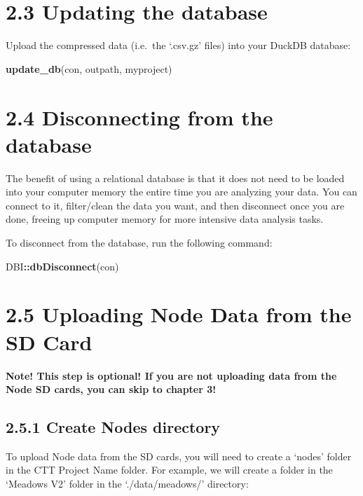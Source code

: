 \documentclass[
]{book}
\newenvironment{Shaded}{\begin{snugshade}}{\end{snugshade}}
\newcommand{\FunctionTok}[1]{\textcolor[rgb]{0.13,0.29,0.53}{\textbf{#1}}}
\newcommand{\NormalTok}[1]{#1}
\newcommand{\SpecialCharTok}[1]{\textcolor[rgb]{0.81,0.36,0.00}{\textbf{#1}}}
\begin{document}
\section{2.3 Updating the database}\label{updating-the-database}

Upload the compressed data (i.e.~the `.csv.gz' files) into your DuckDB database:

\begin{Shaded}
\begin{Highlighting}[]
\FunctionTok{update\_db}\NormalTok{(con, outpath, myproject)}
\end{Highlighting}
\end{Shaded}

\section{2.4 Disconnecting from the database}\label{disconnecting-from-the-database}

The benefit of using a relational database is that it does not need to be loaded into your computer memory the entire time you are analyzing your data. You can connect to it, filter/clean the data you want, and then disconnect once you are done, freeing up computer memory for more intensive data analysis tasks.

To disconnect from the database, run the following command:

\begin{Shaded}
\begin{Highlighting}[]
\NormalTok{DBI}\SpecialCharTok{::}\FunctionTok{dbDisconnect}\NormalTok{(con)}
\end{Highlighting}
\end{Shaded}

\section{2.5 Uploading Node Data from the SD Card}\label{uploading-node-data-from-the-sd-card}

\textbf{Note! This step is optional! If you are not uploading data from the Node SD cards, you can skip to chapter 3!}

\subsection{2.5.1 Create Nodes directory}\label{create-nodes-directory}

To upload Node data from the SD cards, you will need to create a `nodes' folder in the CTT Project Name folder. For example, we will create a folder in the `Meadows V2' folder in the `./data/meadows/' directory:
\end{document}
